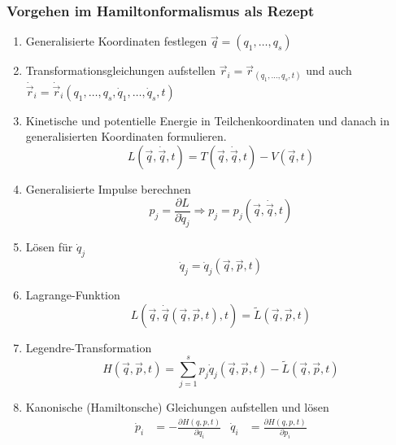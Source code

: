 \documentclass[oneside]{book}
\theoremstyle{definition}
\newcommand{\ffpartial}[2]{\frac{\partial #1}{\partial #2}}
\newcommand{\dotvec}[1]{\dot{\vec{#1}}}
\begin{document}
\subsubsection{Vorgehen im Hamiltonformalismus als Rezept}
\begin{enumerate}
	\item Generalisierte Koordinaten festlegen $\vec{q} = (q_1, \dots, q_s)$
	\item Transformationsgleichungen aufstellen $\vec{r}_i = \vec{r}_(q_1, \dots, q_s, t)$ und auch $\dotvec{r}_i = \dotvec{r}_i(q_1, \dots, q_s, \dot{q}_1, \dots, \dot{q}_s, t)$
	\item Kinetische und potentielle Energie in Teilchenkoordinaten und danach in generalisierten Koordinaten formulieren.
	$$L(\vec{q}, \dotvec{q}, t) = T(\vec{q}, \dotvec q,t)  - V(\vec{q}, t)$$
	\item Generalisierte Impulse berechnen
		$$p_j = \ffpartial{L}{\dot{q}_j} \Rightarrow p_j = p_j(\vec{q}, \dotvec{q}, t)$$
	\item Lösen für $\dot{q}_j$
	$$\dot{q}_j = \dot{q}_j (\vec{q}, \vec{p}, t)$$
	\item Lagrange-Funktion
	$$L(\vec{q}, \dotvec{q}(\vec{q}, \vec{p}, t), t) = \tilde{L}(\vec{q}, \vec{p}, t)$$
	\item Legendre-Transformation
	$$H(\vec{q}, \vec{p}, t) = \sum_{j=1}^s p_j \dot{q}_j(\vec{q}, \vec{p}, t) - \tilde{L}(\vec{q}, \vec{p}, t)$$
	\item Kanonische (Hamiltonsche) Gleichungen aufstellen und lösen
	\begin{align*}
	\dot{p}_i &= -\ffpartial{H(q,p,t)}{q_i} & \dot{q}_i &= \ffpartial{H(q,p,t)}{p_i}
	\end{align*}
\end{enumerate}
\end{document}
